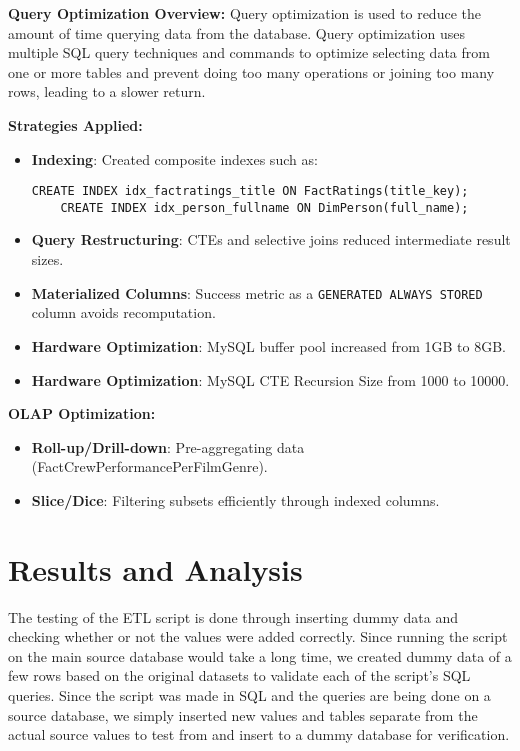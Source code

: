 \documentclass[sigconf, pbalance]{acmart}
\begin{document}
\textbf{Query Optimization Overview:}  
Query optimization is used to reduce the amount of time querying data from the database. Query optimization uses multiple SQL query techniques and commands to optimize selecting data from one or more tables and prevent doing too many operations or joining too many rows, leading to a slower return. 

\textbf{Strategies Applied:}
\begin{itemize}
    \item \textbf{Indexing}: Created composite indexes such as:
    \begin{lstlisting}[style=SQLStyle]
    CREATE INDEX idx_factratings_title ON FactRatings(title_key);
    CREATE INDEX idx_person_fullname ON DimPerson(full_name);
    \end{lstlisting}
    \item \textbf{Query Restructuring}: CTEs and selective joins reduced intermediate result sizes.
    \item \textbf{Materialized Columns}: Success metric as a \texttt{GENERATED ALWAYS STORED} column avoids recomputation.
    \item \textbf{Hardware Optimization}: MySQL buffer pool increased from 1GB to 8GB.
    \item \textbf{Hardware Optimization}: MySQL CTE Recursion Size from 1000 to 10000.
\end{itemize}

\textbf{OLAP Optimization:}
\begin{itemize}
    \item \textbf{Roll-up/Drill-down}: Pre-aggregating data (FactCrewPerformancePerFilmGenre).
    \item \textbf{Slice/Dice}: Filtering subsets efficiently through indexed columns.
\end{itemize}

\section{Results and Analysis}

The testing of the ETL script is done through inserting dummy data and checking whether or not the values were added correctly. Since running the script on the main source database would take a long time, we created dummy data of a few rows based on the original datasets to validate each of the script's SQL queries. Since the script was made in SQL and the queries are being done on a source database, we simply inserted new values and tables separate from the actual source values to test from and insert to a dummy database for verification. 
\end{document}
